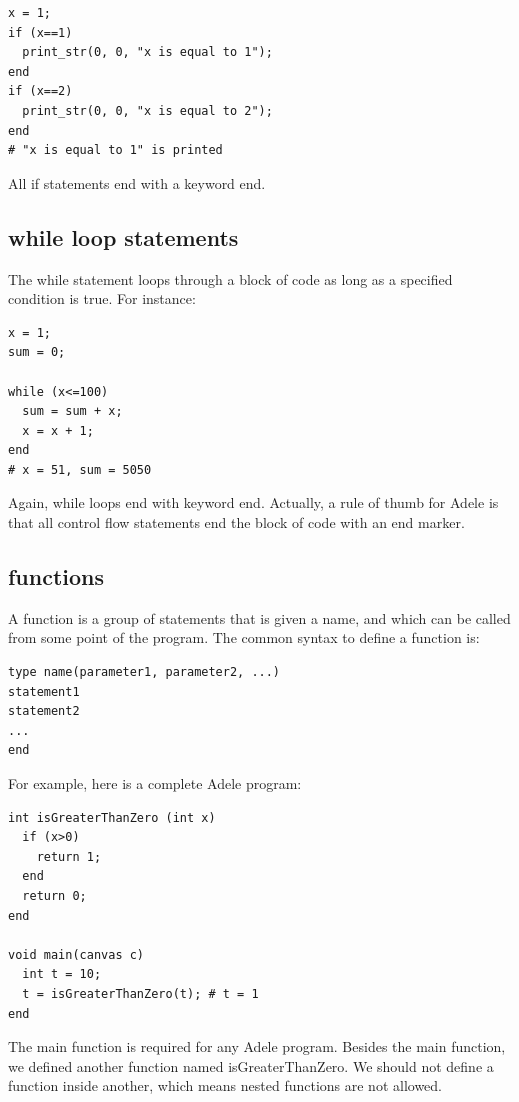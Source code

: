 \documentclass[11pt,letterpaper]{article}
\begin{document}
\begin{lstlisting}[caption=if.adl, label=if, captionpos=b]
x = 1;
if (x==1)
  print_str(0, 0, "x is equal to 1");
end
if (x==2)
  print_str(0, 0, "x is equal to 2");
end
# "x is equal to 1" is printed
\end{lstlisting}

All if statements end with a keyword end.

\subsection {while loop statements}

The while statement loops through a block of code as long as a specified condition is true. For instance:

\begin{lstlisting}[caption=while.adl, label=while, captionpos=b]
x = 1;
sum = 0;

while (x<=100)
  sum = sum + x;
  x = x + 1;
end
# x = 51, sum = 5050
\end{lstlisting}

Again, while loops end with keyword end. Actually, a rule of thumb for Adele is that all control flow statements end the block of code with an end marker.

\subsection {functions}
A function is a group of statements that is given a name, and which can be called from some point of the program. The common syntax to define a function is:

\begin{lstlisting}
type name(parameter1, parameter2, ...)
statement1
statement2
...
end
\end{lstlisting}

For example, here is a complete Adele program:

\begin{lstlisting}[caption=func.adl, label=func, captionpos=b]
int isGreaterThanZero (int x)
  if (x>0)
    return 1;
  end
  return 0;
end

void main(canvas c)
  int t = 10;
  t = isGreaterThanZero(t); # t = 1
end
\end{lstlisting}

The main function is required for any Adele program. Besides the main function, we defined another function named isGreaterThanZero. We should not define a function inside another, which means nested functions are not allowed.
\end{document}
